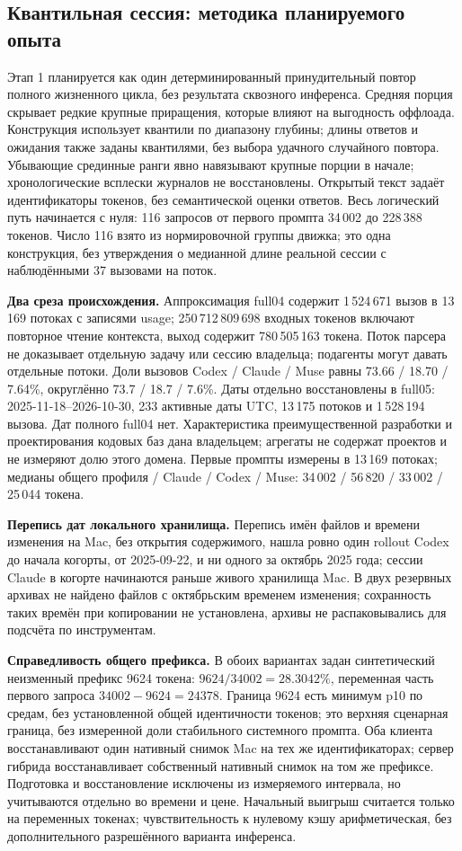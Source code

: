 \subsection{Квантильная сессия: методика планируемого опыта}
\label{app:lifecycle-methods}
Этап 1 планируется как один детерминированный принудительный повтор полного жизненного цикла,
без результата сквозного инференса. Средняя порция скрывает редкие крупные приращения,
которые влияют на выгодность оффлоада. Конструкция использует квантили по диапазону глубины;
длины ответов и ожидания также заданы квантилями, без выбора удачного случайного повтора.
Убывающие срединные ранги явно навязывают крупные порции в начале; хронологические всплески журналов не восстановлены.
Открытый текст задаёт идентификаторы токенов, без семантической оценки ответов.
Весь логический путь начинается с нуля: 116 запросов от первого промпта 34\,002 до 228\,388 токенов.
Число 116 взято из нормировочной группы движка; это одна конструкция,
без утверждения о медианной длине реальной сессии с наблюдёнными 37 вызовами на поток.

\textbf{Два среза происхождения.} Аппроксимация full04 содержит 1\,524\,671 вызов в 13\,169 потоках с записями usage;
250\,712\,809\,698 входных токенов включают повторное чтение контекста, выход содержит 780\,505\,163 токена.
Поток парсера не доказывает отдельную задачу или сессию владельца; подагенты могут давать отдельные потоки.
Доли вызовов Codex / Claude / Muse равны 73.66 / 18.70 / 7.64\%, округлённо 73.7 / 18.7 / 7.6\%.
Даты отдельно восстановлены в full05: 2025-11-18--2026-10-30, 233 активные даты UTC,
13\,175 потоков и 1\,528\,194 вызова. Дат полного full04 нет.
Характеристика преимущественной разработки и проектирования кодовых баз дана владельцем;
агрегаты не содержат проектов и не измеряют долю этого домена.
Первые промпты измерены в 13\,169 потоках; медианы общего профиля / Claude / Codex / Muse:
34\,002 / 56\,820 / 33\,002 / 25\,044 токена.

\textbf{Перепись дат локального хранилища.} Перепись имён файлов и времени изменения на Mac,
без открытия содержимого, нашла ровно один rollout Codex до начала когорты, от 2025-09-22,
и ни одного за октябрь 2025 года; сессии Claude в когорте начинаются раньше живого хранилища Mac.
В двух резервных архивах не найдено файлов с октябрьским временем изменения;
сохранность таких времён при копировании не установлена, архивы не распаковывались для подсчёта по инструментам.

\textbf{Справедливость общего префикса.} В обоих вариантах задан синтетический неизменный префикс 9624 токена:
$9624/34002=28.3042\%$, переменная часть первого запроса $34002-9624=24378$.
Граница 9624 есть минимум p10 по средам, без установленной общей идентичности токенов;
это верхняя сценарная граница, без измеренной доли стабильного системного промпта.
Оба клиента восстанавливают один нативный снимок Mac на тех же идентификаторах;
сервер гибрида восстанавливает собственный нативный снимок на том же префиксе.
Подготовка и восстановление исключены из измеряемого интервала, но учитываются отдельно во времени и цене.
Начальный выигрыш считается только на переменных токенах; чувствительность к нулевому кэшу арифметическая,
без дополнительного разрешённого варианта инференса.


